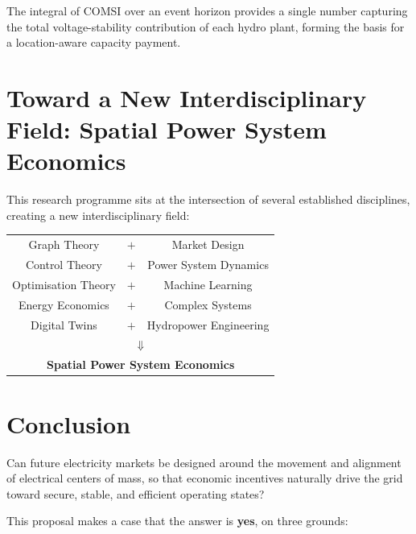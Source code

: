 \documentclass[12pt, a4paper]{article}
\begin{document}
The integral of COMSI over an event horizon provides a single number capturing
the total voltage-stability contribution of each hydro plant, forming the basis
for a location-aware capacity payment.

\section{Toward a New Interdisciplinary Field: Spatial Power System Economics}
\label{sec:field}

This research programme sits at the intersection of several established
disciplines, creating a new interdisciplinary field:

\begin{center}
\begin{tabular}{ccc}
  Graph Theory & $+$ & Market Design \\
  Control Theory & $+$ & Power System Dynamics \\
  Optimisation Theory & $+$ & Machine Learning \\
  Energy Economics & $+$ & Complex Systems \\
  Digital Twins & $+$ & Hydropower Engineering \\
  \multicolumn{3}{c}{$\Downarrow$} \\
  \multicolumn{3}{c}{\textbf{Spatial Power System Economics}} \\
\end{tabular}
\end{center}

\section*{Conclusion}

\begin{hypothesis}[title=The Central Scientific Question]
Can future electricity markets be designed around the movement and alignment
of electrical centers of mass, so that economic incentives naturally drive the
grid toward secure, stable, and efficient operating states?
\end{hypothesis}

This proposal makes a case that the answer is \textbf{yes}, on three grounds:
\end{document}
